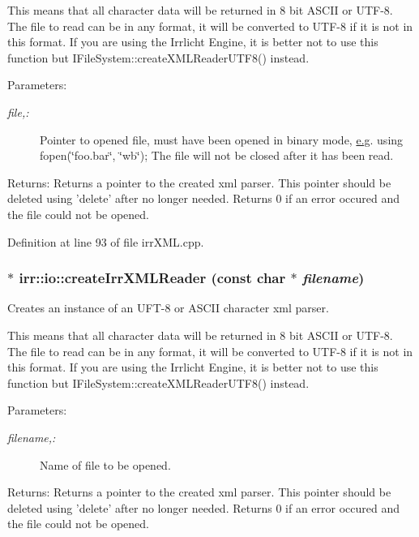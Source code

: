 This means that all character data will be returned in 8 bit ASCII or UTF-8. The file to read can be in any format, it will be converted to UTF-8 if it is not in this format. If you are using the Irrlicht Engine, it is better not to use this function but IFileSystem::createXMLReaderUTF8() instead. \begin{Desc}
\item[Parameters:]
\begin{description}
\item[{\em file,:}]Pointer to opened file, must have been opened in binary mode, \hyperlink{glext__bak_8h_caceb3a655ff28b75259860bcb868f9f}{e.g}. using fopen(\char`\"{}foo.bar\char`\"{}, \char`\"{}wb\char`\"{}); The file will not be closed after it has been read. \end{description}
\end{Desc}
\begin{Desc}
\item[Returns:]Returns a pointer to the created xml parser. This pointer should be deleted using 'delete' after no longer needed. Returns 0 if an error occured and the file could not be opened. \end{Desc}


Definition at line 93 of file irrXML.cpp.\hypertarget{namespaceirr_1_1io_a79dd5b9dae1b75be3dec4374176a5ce}{
\subsubsection[{createIrrXMLReader}]{ $\ast$ irr::io::createIrrXMLReader (const char $\ast$ {\em filename})}}
\label{namespaceirr_1_1io_a79dd5b9dae1b75be3dec4374176a5ce}


Creates an instance of an UFT-8 or ASCII character xml parser. 

This means that all character data will be returned in 8 bit ASCII or UTF-8. The file to read can be in any format, it will be converted to UTF-8 if it is not in this format. If you are using the Irrlicht Engine, it is better not to use this function but IFileSystem::createXMLReaderUTF8() instead. \begin{Desc}
\item[Parameters:]
\begin{description}
\item[{\em filename,:}]Name of file to be opened. \end{description}
\end{Desc}
\begin{Desc}
\item[Returns:]Returns a pointer to the created xml parser. This pointer should be deleted using 'delete' after no longer needed. Returns 0 if an error occured and the file could not be opened. \end{Desc}



